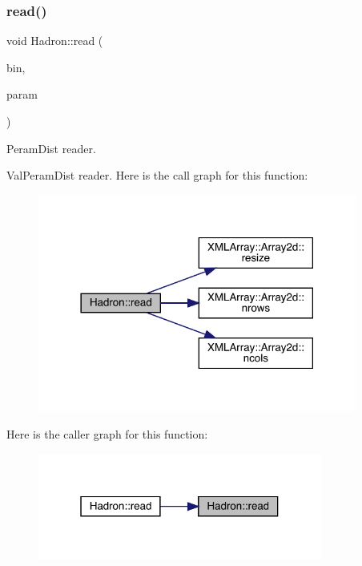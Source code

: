 \subsubsection{\texorpdfstring{read()}{read()}\hspace{0.1cm}{\footnotesize\ttfamily [69/94]}}
{\footnotesize\ttfamily void Hadron\+::read (\begin{DoxyParamCaption}\item[{\mbox{\hyperlink{classADATIO_1_1BinaryReader}{Binary\+Reader}} \&}]{bin,  }\item[{\mbox{\hyperlink{structHadron_1_1ValPeramDist__t}{Val\+Peram\+Dist\+\_\+t}} \&}]{param }\end{DoxyParamCaption})}



Peram\+Dist reader. 

Val\+Peram\+Dist reader. Here is the call graph for this function\+:
\nopagebreak
\begin{figure}[H]
\begin{center}
\leavevmode
\includegraphics[width=297pt]{d1/daf/namespaceHadron_a030f71bff6ae10166b42e24845e0dbf8_cgraph}
\end{center}
\end{figure}
Here is the caller graph for this function\+:
\nopagebreak
\begin{figure}[H]
\begin{center}
\leavevmode
\includegraphics[width=265pt]{d1/daf/namespaceHadron_a030f71bff6ae10166b42e24845e0dbf8_icgraph}
\end{center}
\end{figure}
\mbox{\label{namespaceHadron_a2aedc52f1b4f522f0fc13bbf7426e727}} 
